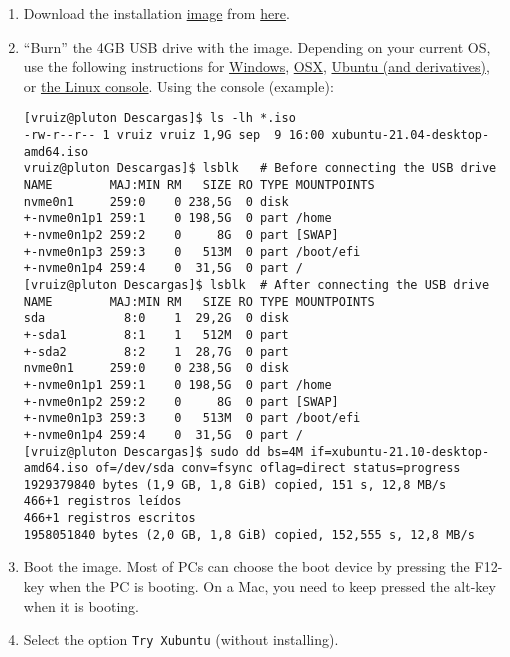 \begin{enumerate}
\item Download the
  installation \href{https://en.wikipedia.org/wiki/Disk_image}{image}
  from \href{https://xubuntu.org/download/}{here}.
  
\item ``Burn'' the 4GB USB drive with the image. Depending on your
  current OS, use the following instructions
  for \href{https://ubuntu.com/tutorials/create-a-usb-stick-on-windows#1-overview}{Windows}, \href{https://ubuntu.com/tutorials/create-a-usb-stick-on-macos#1-overview}{OSX}, \href{https://ubuntu.com/tutorials/create-a-usb-stick-on-ubuntu#1-overview}{Ubuntu
    (and derivatives)},
  or \href{https://askubuntu.com/questions/372607/how-to-create-a-bootable-ubuntu-usb-flash-drive-from-terminal}{the Linux
    console}. Using the console (example):
  
\begin{verbatim}
[vruiz@pluton Descargas]$ ls -lh *.iso
-rw-r--r-- 1 vruiz vruiz 1,9G sep  9 16:00 xubuntu-21.04-desktop-amd64.iso
vruiz@pluton Descargas]$ lsblk   # Before connecting the USB drive
NAME        MAJ:MIN RM   SIZE RO TYPE MOUNTPOINTS
nvme0n1     259:0    0 238,5G  0 disk 
+-nvme0n1p1 259:1    0 198,5G  0 part /home
+-nvme0n1p2 259:2    0     8G  0 part [SWAP]
+-nvme0n1p3 259:3    0   513M  0 part /boot/efi
+-nvme0n1p4 259:4    0  31,5G  0 part /
[vruiz@pluton Descargas]$ lsblk  # After connecting the USB drive 
NAME        MAJ:MIN RM   SIZE RO TYPE MOUNTPOINTS
sda           8:0    1  29,2G  0 disk 
+-sda1        8:1    1   512M  0 part 
+-sda2        8:2    1  28,7G  0 part 
nvme0n1     259:0    0 238,5G  0 disk 
+-nvme0n1p1 259:1    0 198,5G  0 part /home
+-nvme0n1p2 259:2    0     8G  0 part [SWAP]
+-nvme0n1p3 259:3    0   513M  0 part /boot/efi
+-nvme0n1p4 259:4    0  31,5G  0 part /
[vruiz@pluton Descargas]$ sudo dd bs=4M if=xubuntu-21.10-desktop-amd64.iso of=/dev/sda conv=fsync oflag=direct status=progress
1929379840 bytes (1,9 GB, 1,8 GiB) copied, 151 s, 12,8 MB/s
466+1 registros leídos
466+1 registros escritos
1958051840 bytes (2,0 GB, 1,8 GiB) copied, 152,555 s, 12,8 MB/s
\end{verbatim}

\item Boot the image. Most of PCs can choose the boot device by pressing the
  F12-key when the PC is booting. On a Mac, you need to keep pressed
  the alt-key when it is booting.
  
\item Select the option \texttt{Try Xubuntu} (without installing).


\end{enumerate}
